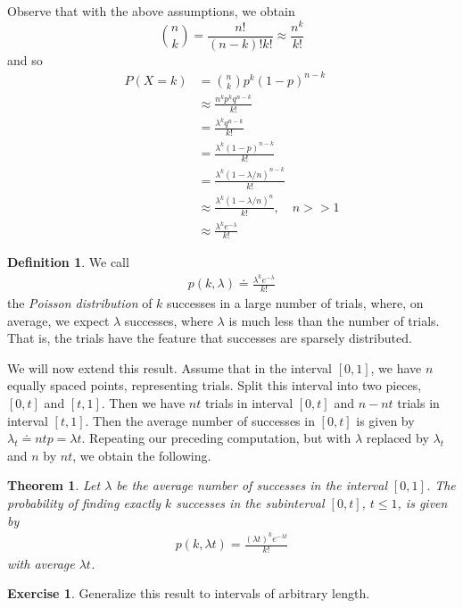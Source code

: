 \documentclass[12pt]{article}
\theoremstyle{plain}
\newtheorem{theorem}{Theorem}
\theoremstyle{definition}
\newtheorem*{definition}{Definition}
\newtheorem*{exercise}{Exercise}
\theoremstyle{remark}
\numberwithin{equation}{section}  %
\begin{document}
Observe that with the above assumptions, we obtain
\begin{equation*}
    \binom{n}{k} = \frac{n!}{(n-k)! k!} \approx \frac{n^k}{k!}
\end{equation*}
and so
\begin{align*}
    P(X = k)
    & = \binom{n}{k} p^k {(1 - p)}^{n-k} \\
    & \approx \frac{n^k p^k q^{n-k}}{k!} \\
    & = \frac{\lambda^k q^{n-k}}{k!} \\
    & = \frac{\lambda^k {(1-p)}^{n-k}}{k!} \\
    & = \frac{\lambda^k {(1-\lambda/n)}^{n-k}}{k!} \\
    & \approx \frac{\lambda^k {(1-\lambda/n)}^{n}}{k!} , \quad n >> 1\\
    & \approx \frac{\lambda^k e^{-\lambda}}{k!}
\end{align*}
\begin{definition}
    We call
    \begin{align*}
        p(k, \lambda) \doteq \frac{\lambda^k e^{-\lambda}}{k!}
    \end{align*}
    the \emph{Poisson distribution} of $k$ successes in a large number
    of trials, where, on average, we expect $\lambda$ successes,
    where $\lambda$ is much less than the number of trials.
    That is, the trials have the feature that successes are
    sparsely distributed.
\end{definition}
We will now extend this result. Assume that in the interval $[0,1]$,
we have $n$ equally spaced points, representing trials. Split this interval into two pieces,
$[0,t]$ and $[t, 1]$. Then we have $nt$ trials in interval $[0,t]$ and
$n - nt$ trials in interval $[t,1]$. Then the average number of successes
in $[0,t]$ is given by $\lambda_t \doteq n t p = \lambda t$. Repeating
our preceding computation, but with $\lambda$ replaced by $\lambda_t$
and $n$ by $nt$, we obtain the following.
\begin{theorem}
    Let $\lambda$ be the average number of successes in the interval $[0,1]$.
    The probability of finding exactly $k$ successes  in the subinterval $[0,t]$,
    $t \le 1$, is given by
    \begin{align*}
        p(k, \lambda t) = \frac{{(\lambda t)}^{k} e^{-\lambda t}}{k!}
    \end{align*}
    with average $\lambda t$.
\end{theorem}
\begin{exercise}
    Generalize this result to intervals of arbitrary length.
\end{exercise}
\end{document}
